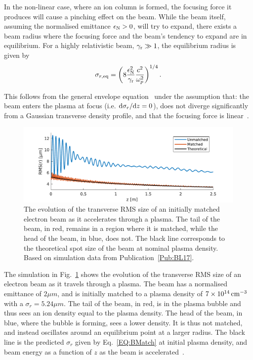 In the non-linear case, where an ion column is formed, the focusing force it produces will cause a pinching effect on the beam. While the beam itself, assuming the normalised emittance $\epsilon_{\mathrm{N}} > 0$, will try to expand, there exists a beam radius where the focusing force and the beam's tendency to expand are in equilibrium. For a highly relativistic beam, $\gamma_{\mathrm{r}} \gg 1$, the equilibrium radius is given by~\cite{krall:1995}
\begin{equation}
    \sigma_{r,\mathrm{eq}} = \left( 8 \frac{\epsilon_{\mathrm{N}}^2}{\gamma_{\mathrm{r}}} \frac{c^2}{\omega_{p}^2} \right)^{1/4}. \label{EQ:BMatch}
\end{equation}

This follows from the general envelope equation~\cite{lee:1976} under the assumption that: the beam enters the plasma at focus (i.e. $\mathrm{d}\sigma_{r}/\mathrm{d} z = 0$), does not diverge significantly from a Gaussian transverse density profile, and that the focusing force is linear~\cite{krall:1995}.

\begin{figure}[hbt]
    \centering
    \includegraphics[width=0.875\linewidth,trim={0mm 0mm 0mm 0mm},clip]{figures/BeamMatching}
    \caption{\label{Fig:BPI:Match} The evolution of the transverse RMS size of an initially matched electron beam as it accelerates through a plasma. The tail of the beam, in red, remains in a region where it is matched, while the head of the beam, in blue, does not. The black line corresponds to the theoretical spot size of the beam at nominal plasma density. Based on simulation data from Publication~\ref{Pub:BL17}.}
\end{figure}

The simulation in Fig.~\ref{Fig:BPI:Match} shows the evolution of the transverse RMS size of an electron beam as it travels through a plasma. The beam has a normalised emittance of $2\unit{\mu m}$, and is initially matched to a plasma density of $7\times 10^{14}\,\mathrm{cm}^{-3}$ with a $\sigma_{r} = 5.24\unit{\mu m}$. The tail of the beam, in red, is in the plasma bubble and thus sees an ion density equal to the plasma density. The head of the beam, in blue, where the bubble is forming, sees a lower density. It is thus not matched, and instead oscillates around an equilibrium point at a larger radius. The black line is the predicted $\sigma_{r}$ given by Eq.~\ref{EQ:BMatch} at initial plasma density, and beam energy as a function of $z$ as the beam is accelerated~\cite{berglyd_olsen:2018}.


